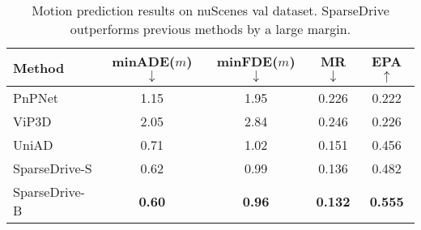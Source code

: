 \begin{table}[htbp]
\centering
\caption{Motion prediction results on nuScenes val dataset. SparseDrive outperforms previous methods by a large margin.}
{
\scriptsize
{
\begin{tabular}{l|cccc}
\toprule
Method & \cellcolor{gray!30}minADE($m$)$\downarrow$ & minFDE($m$)$\downarrow$ & MR$\downarrow$ & EPA$\uparrow$  \\
\midrule
PnPNet~\cite{pnpnet} & \cellcolor{gray!30}1.15 & 1.95 & 0.226 & 0.222 \\
ViP3D~\cite{vip3d} & \cellcolor{gray!30}2.05 & 2.84 & 0.246 & 0.226 \\
UniAD\cite{uniad} & \cellcolor{gray!30}0.71 & 1.02 & 0.151 & 0.456 \\
SparseDrive-S & \cellcolor{gray!30}0.62 & 0.99 & 0.136 & 0.482 \\
SparseDrive-B & \cellcolor{gray!30}\textbf{0.60} & \textbf{0.96} & \textbf{0.132} & \textbf{0.555} \\
\bottomrule
\end{tabular}
}
}
\vspace{5pt}
\label{tab:motion}
\end{table} 